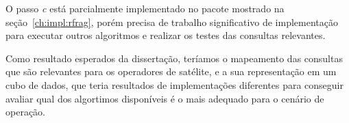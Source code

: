 O passo \textit{c} está parcialmente implementado no pacote mostrado na seção~\ref{ch:impl:rfrag}, porém precisa de trabalho significativo de implementação para executar outros algoritmos e realizar os testes das consultas relevantes.

Como resultado esperados da dissertação, teríamos o mapeamento das consultas que são relevantes para os operadores de satélite, e a sua representação em um cubo de dados, que teria resultados de implementações diferentes para conseguir avaliar qual dos algortimos disponíveis é o mais adequado para o cenário de operação.




